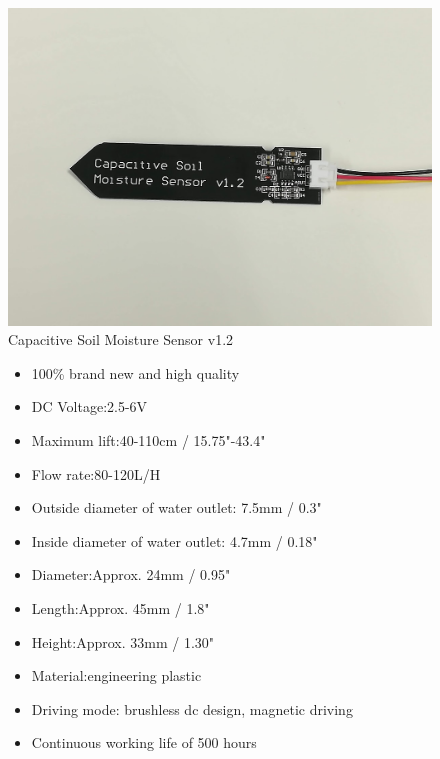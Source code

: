 \documentclass[a4paper,12pt,twoside,openright,titlepage]{book}
\begin{document}
\begin{figure}[!ht]
  \centering
      \includegraphics[scale=0.20]{capacitive-sensor}
  \caption{Capacitive Soil Moisture Sensor v1.2}
  \label{fig:capacitive}
\end{figure}

\begin{figure}[ht!]
	\begin{itemize}
	\item 100\% brand new and high quality
	\item DC Voltage:2.5-6V
	\item Maximum lift:40-110cm / 15.75"-43.4"
	\item Flow rate:80-120L/H
	\item Outside diameter of water outlet: 7.5mm / 0.3"
	\item Inside diameter of water outlet: 4.7mm / 0.18"
	\item Diameter:Approx. 24mm / 0.95"
	\item Length:Approx. 45mm / 1.8"
	\item Height:Approx. 33mm / 1.30"
	\item Material:engineering plastic
	\item Driving mode: brushless dc design, magnetic driving
	\item Continuous working life of 500 hours
	\end{itemize}
	\label{fig:pump description}
\end{figure}
\end{document}

